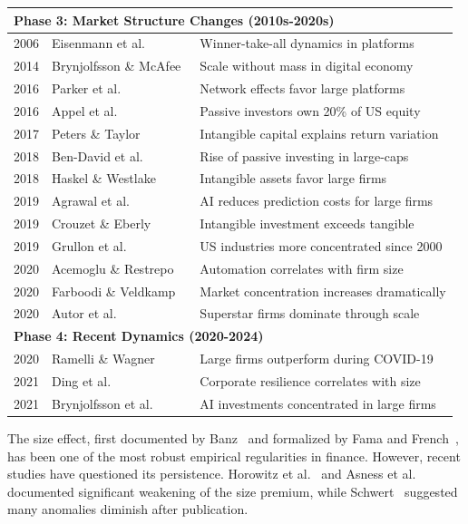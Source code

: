 \documentclass[10pt,letterpaper]{article}
\begin{document}
\begin{longtable}{p{2cm}p{3.5cm}p{6cm}}
\hline
\multicolumn{3}{l}{\textbf{Phase 3: Market Structure Changes (2010s-2020s)}} \\
\hline
2006 & Eisenmann et al.~\cite{eisenmann2006} & Winner-take-all dynamics in platforms \\
2014 & Brynjolfsson \& McAfee~\cite{brynjolfsson2014} & Scale without mass in digital economy \\
2016 & Parker et al.~\cite{parker2016} & Network effects favor large platforms \\
2016 & Appel et al.~\cite{appel2016} & Passive investors own 20\% of US equity \\
2017 & Peters \& Taylor~\cite{peters2017} & Intangible capital explains return variation \\
2018 & Ben-David et al.~\cite{bendavid2018} & Rise of passive investing in large-caps \\
2018 & Haskel \& Westlake~\cite{haskel2018} & Intangible assets favor large firms \\
2019 & Agrawal et al.~\cite{agrawal2019} & AI reduces prediction costs for large firms \\
2019 & Crouzet \& Eberly~\cite{crouzet2019} & Intangible investment exceeds tangible \\
2019 & Grullon et al.~\cite{grullon2019} & US industries more concentrated since 2000 \\
2020 & Acemoglu \& Restrepo~\cite{acemoglu2020} & Automation correlates with firm size \\
2020 & Farboodi \& Veldkamp~\cite{farboodi2020} & Market concentration increases dramatically \\
2020 & Autor et al.~\cite{autor2020} & Superstar firms dominate through scale \\
\hline
\multicolumn{3}{l}{\textbf{Phase 4: Recent Dynamics (2020-2024)}} \\
\hline
2020 & Ramelli \& Wagner~\cite{ramelli2020} & Large firms outperform during COVID-19 \\
2021 & Ding et al.~\cite{ding2021} & Corporate resilience correlates with size \\
2021 & Brynjolfsson et al.~\cite{brynjolfsson2021} & AI investments concentrated in large firms \\
\end{longtable}

The size effect, first documented by Banz~\cite{banz1981} and formalized by Fama and French~\cite{fama1993}, has been one of the most robust empirical regularities in finance. However, recent studies have questioned its persistence. Horowitz et al.~\cite{horowitz2000} and Asness et al.~\cite{asness2018} documented significant weakening of the size premium, while Schwert~\cite{schwert2003} suggested many anomalies diminish after publication.
\end{document}
